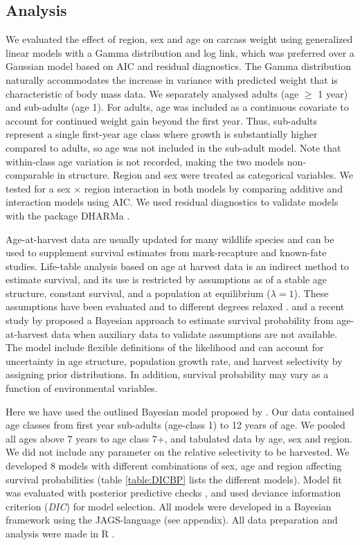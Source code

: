 \documentclass[12pt,a4paper,final,abstract=true,headings=small]{scrartcl}
\begin{document}
\subsection*{Analysis}

We evaluated the effect of region, sex and age on carcass weight using generalized linear models with a Gamma distribution and log link, which was preferred over a Gaussian model based on AIC and residual diagnostics. The Gamma distribution naturally accommodates the increase in variance with predicted weight that is characteristic of body mass data. We separately analysed adults (age $\geq$ 1 year) and sub-adults (age 1). For adults, age was included as a continuous covariate to account for continued weight gain beyond the first year. Thus, sub-adults represent a single first-year age class where growth is substantially higher compared to adults, so age was not included in the sub-adult model. Note that within-class age variation is not recorded, making the two models non-comparable in structure. Region and sex were treated as categorical variables. We tested for a sex $\times$ region interaction in both models by comparing additive and interaction models using AIC. We used residual diagnostics to validate models with the package DHARMa \citep{hartigDHARMaResidualDiagnostics2022}.

Age-at-harvest data are usually updated for many wildlife species and can be used to supplement survival estimates from mark-recapture and known-fate studies. Life-table analysis based on age at harvest data is an indirect method to estimate survival, and its use is restricted by assumptions as of a stable age structure, constant survival, and a population at equilibrium ($\lambda = 1$). These assumptions have been evaluated and to different degrees relaxed \citep{udevitzEstimatingSurvivalRates1998}. and a recent study by \citet{skellyFlexibleBayesianApproach} proposed a Bayesian approach to estimate survival probability from age-at-harvest data when auxiliary data to validate assumptions are not available. The model include flexible definitions of the likelihood and can account for uncertainty in age structure, population growth rate, and harvest selectivity by assigning prior distributions. In addition,  survival probability may vary as a function of environmental variables.

Here we have used the outlined Bayesian model proposed by \citet{skellyFlexibleBayesianApproach}. Our data contained age classes from first year sub-adults (age-class 1) to 12 years of age. We pooled all ages above 7 years to age class 7+, and tabulated data by age, sex and region. We did not include any parameter on the relative selectivity to be harvested. We developed 8 models  with different combinations of sex, age and region affecting survival probabilities (table \ref{table:DICBP} lists the different models). Model fit was evaluated with posterior predictive checks \citep{keryIntroductionWinBUGSEcologists2010}, and used deviance information criterion (\emph{DIC}) for model selection. All models were developed in a Bayesian framework using the JAGS-language \citep{plummerJAGSProgramAnalysis2003b} (see appendix). All data preparation and analysis were made in R \citep{rcoreteamLanguageEnvironmentStatistical2024b}.
\end{document}
